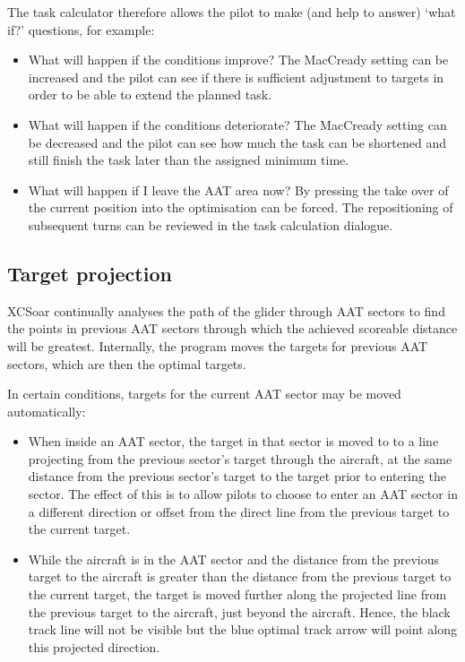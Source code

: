 The task calculator therefore allows the pilot to make (and help to
answer) `what if?' questions, for example:
\begin{itemize}
\item What will happen if the conditions improve?  The MacCready setting can be 
increased and the pilot can see if there is sufficient adjustment to targets in 
order to be able to extend the planned task.
\item What will happen if the conditions deteriorate?  The MacCready setting can 
be decreased and the pilot can see how much the task can be shortened and still 
finish the task later than the assigned minimum time.
\item What will happen if I leave the AAT area now?  By pressing  the take over of the current position into the optimisation can
be forced. The repositioning of subsequent turns can be reviewed in the task calculation
dialogue.
\end{itemize}

\subsection*{Target projection}

XCSoar continually analyses the path of the glider through AAT sectors
to find the points in previous AAT sectors through which the achieved
scoreable distance will be greatest.  Internally, the program moves
the targets for previous AAT sectors, which are then the optimal
targets.

In certain conditions, targets for the current AAT sector may be moved
automatically:
\begin{itemize}
\item When inside an AAT sector, the target in that sector is moved to
to a line projecting from the previous sector's target through the
aircraft, at the same distance from the previous sector's target to
the target prior to entering the sector.  The effect of this is to
allow pilots to choose to enter an AAT sector in a different direction
or offset from the direct line from the previous target to the current
target.

\item While the aircraft is in the AAT sector and the distance from the
previous target to the aircraft is greater than the distance from the
previous target to the current target, the target is moved further
along the projected line from the previous target to the aircraft,
just beyond the aircraft.  Hence, the black track line will not be
visible but the blue optimal track arrow will point along this
projected direction.
\end{itemize}


